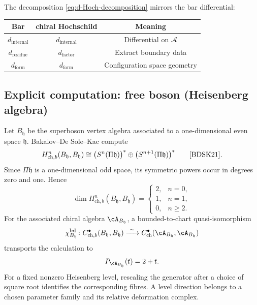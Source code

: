 \begin{remark}
The decomposition \eqref{eq:d-Hoch-decomposition} mirrors the bar differential:
\begin{center}
\begin{tabular}{c|c|c}
\textbf{Bar} & \textbf{chiral Hochschild} & \textbf{Meaning} \\
\hline
$d_{\text{internal}}$ & $d_{\text{internal}}$ & Differential on $\mathcal{A}$ \\
$d_{\text{residue}}$ & $d_{\text{factor}}$ & Extract boundary data \\
$d_{\text{form}}$ & $d_{\text{form}}$ & Configuration space geometry \\
\end{tabular}
\end{center}
\end{remark}

\subsection{Explicit computation: free boson (Heisenberg algebra)}

\begin{example}
\label{ex:HH-heisenberg-complete}
Let \(B_{\mathfrak h}\) be the superboson vertex algebra associated to
a one-dimensional even space \(\mathfrak h\).  Bakalov--De Sole--Kac
compute
\[
 H^n_{\mathrm{ch},b}(B_{\mathfrak h},B_{\mathfrak h})
 \cong
 \bigl(S^n(\Pi\mathfrak h)\bigr)^*
 \oplus
 \bigl(S^{n+1}(\Pi\mathfrak h)\bigr)^*
 \qquad\text{\cite[Theorem~7.4]{BDSK21}}.
\]
Since \(\Pi\mathfrak h\) is a one-dimensional odd space, its symmetric
powers occur in degrees zero and one.  Hence
\[
 \dim H^n_{\mathrm{ch},b}(B_{\mathfrak h},B_{\mathfrak h})
 =
 \begin{cases}
  2,&n=0,\\
  1,&n=1,\\
  0,&n\geq2.
 \end{cases}
\]
For the associated chiral algebra \(\cA_{B_{\mathfrak h}}\), a
bounded-to-chart quasi-isomorphism
\[
 \chi_{B_{\mathfrak h}}^{\mathrm{bd}}\colon
 C^\bullet_{\mathrm{ch},b}(B_{\mathfrak h},B_{\mathfrak h})
 \xrightarrow{\ \sim\ }
 C^\bullet_{\mathrm{ch}}
 (\cA_{B_{\mathfrak h}},\cA_{B_{\mathfrak h}})
\]
transports the calculation to
\[
 P_{\cA_{B_{\mathfrak h}}}(t)=2+t.
\]
For a fixed nonzero Heisenberg level, rescaling the generator after a
choice of square root identifies the corresponding fibres.  A level
direction belongs to a chosen parameter family and its relative
deformation complex.
\end{example}

